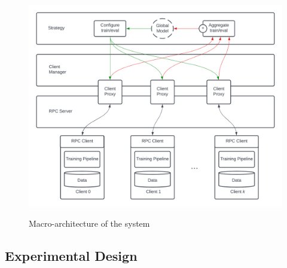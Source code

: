 \documentclass[letterpaper]{article} %
\begin{document}
\begin{figure}[h]
{\includegraphics[width=\columnwidth]{High Level Architecture}}
\caption{Macro-architecture of the system}
\end{figure}

\subsection{Experimental Design}
\end{document}
